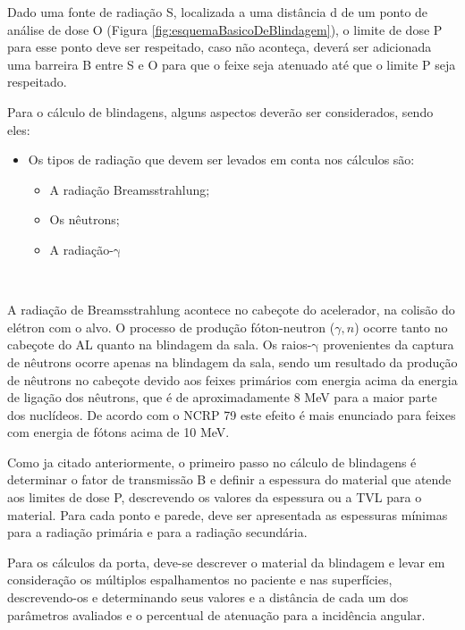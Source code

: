 \documentclass[11pt,a4paper]{article}
\begin{document}
        Dado uma fonte de radiação S, localizada a uma distância d de um ponto de análise de dose O (Figura \ref{fig:esquemaBasicoDeBlindagem}), o limite de dose P para esse ponto deve ser respeitado, caso não aconteça, deverá ser adicionada uma barreira B entre S e O para que o feixe seja atenuado até que o limite P seja respeitado.
        
        Para o cálculo de blindagens, alguns aspectos deverão ser considerados, sendo eles:

        \begin{itemize}
            \item Os tipos de radiação que devem ser levados em conta nos cálculos são:
                \begin{itemize}
                     \item A radiação Breamsstrahlung; 
                     \item Os nêutrons;
                     \item A radiação-$\mathrm{\gamma}$
                \end{itemize}
            \end{itemize}
        
            \

            A radiação de Breamsstrahlung acontece no cabeçote do acelerador, na colisão do elétron com o alvo.
            O processo de produção fóton-neutron ($\gamma, n$) ocorre tanto no cabeçote do AL quanto na blindagem da sala.
            Os raios-$\mathrm{\gamma}$ provenientes da captura de nêutrons ocorre apenas na blindagem da sala, sendo um resultado da produção de nêutrons no cabeçote devido aos feixes primários com energia acima da energia de ligação dos nêutrons, que é de aproximadamente 8 MeV para a maior parte dos nuclídeos. De acordo com o NCRP 79 este efeito é mais enunciado para feixes com energia de fótons acima de 10 MeV.
            

            Como ja citado anteriormente, o primeiro passo no cálculo de blindagens é determinar o fator de transmissão B e definir a espessura do material que atende aos limites de dose P, descrevendo os valores da espessura ou a TVL para o material. Para cada ponto e parede, deve ser apresentada as espessuras mínimas para a radiação primária e para a radiação secundária.

            Para os cálculos da porta, deve-se descrever o material da blindagem e levar em consideração os múltiplos espalhamentos no paciente e nas superfícies, descrevendo-os e determinando seus valores e a distância de cada um dos parâmetros avaliados e o percentual de atenuação para a incidência angular.
\end{document}

